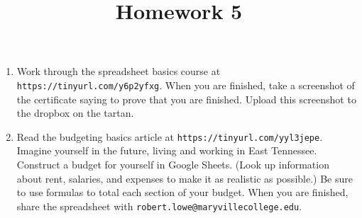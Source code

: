 \documentclass{article}
\title{Homework 5}
\begin{document}
\maketitle

\begin{enumerate}
\item Work through the spreadsheet basics course at {\tt https://tinyurl.com/y6p2yfxg}.
When you are finished, take a screenshot of the certificate saying
to prove that you are finished.  Upload this screenshot to the dropbox
on the tartan.

\item Read the budgeting basics article at {\tt https://tinyurl.com/yyl3jepe}.  
Imagine yourself in the future, living and working in East Tennessee.  Construct a budget
for yourself in Google Sheets.  (Look up information about rent, salaries, and expenses to make it as realistic as possible.)  Be sure to use formulas to total each section of your 
budget.  When you are finished, share the spreadsheet with {\tt robert.lowe@maryvillecollege.edu}.

\end{enumerate}
\end{document}
